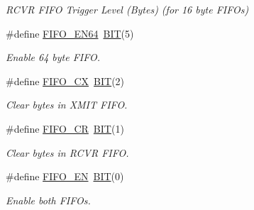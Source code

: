 \begin{DoxyCompactItemize}
\begin{DoxyCompactList}\small\item\em R\+C\+VR F\+I\+FO Trigger Level (Bytes) (for 16 byte F\+I\+F\+Os) \end{DoxyCompactList}\item 
\#define \hyperlink{group___serial_ga870d1e13c64ab331ab0ddabd53f8f6dc}{F\+I\+F\+O\+\_\+\+E\+N64}~\hyperlink{group___serial_ga3a8ea58898cb58fc96013383d39f482c}{B\+IT}(5)
\begin{DoxyCompactList}\small\item\em Enable 64 byte F\+I\+FO. \end{DoxyCompactList}\item 
\#define \hyperlink{group___serial_ga04cb242ce6c87c7e317544b69e213eeb}{F\+I\+F\+O\+\_\+\+CX}~\hyperlink{group___serial_ga3a8ea58898cb58fc96013383d39f482c}{B\+IT}(2)
\begin{DoxyCompactList}\small\item\em Clear bytes in X\+M\+IT F\+I\+FO. \end{DoxyCompactList}\item 
\#define \hyperlink{group___serial_gaf6a8e6e80294a60dfd5f39cf965c4a13}{F\+I\+F\+O\+\_\+\+CR}~\hyperlink{group___serial_ga3a8ea58898cb58fc96013383d39f482c}{B\+IT}(1)
\begin{DoxyCompactList}\small\item\em Clear bytes in R\+C\+VR F\+I\+FO. \end{DoxyCompactList}\item 
\#define \hyperlink{group___serial_ga53954ec7f9dc790f00548da08ccd5ed6}{F\+I\+F\+O\+\_\+\+EN}~\hyperlink{group___serial_ga3a8ea58898cb58fc96013383d39f482c}{B\+IT}(0)
\begin{DoxyCompactList}\small\item\em Enable both F\+I\+FO\textquotesingle{}s. \end{DoxyCompactList}\end{DoxyCompactItemize}
